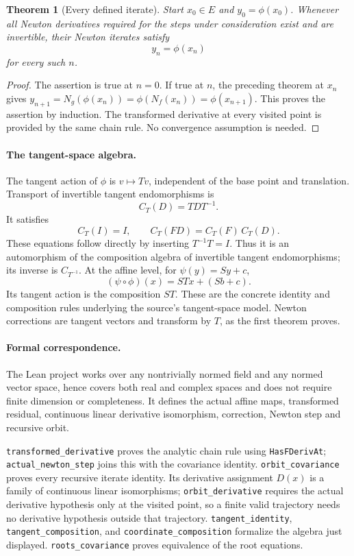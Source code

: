 \documentclass[11pt]{article}
\newtheorem{theorem}{Theorem}
\begin{document}
\newpage
\begin{theorem}[Every defined iterate]
Start $x_0\in E$ and $y_0=\phi(x_0)$. Whenever all Newton derivatives required for the steps under consideration exist and are invertible, their Newton iterates satisfy
\[
 y_n=\phi(x_n)
\]
for every such $n$.
\end{theorem}
\begin{proof}
The assertion is true at $n=0$. If true at $n$, the preceding theorem at $x_n$ gives
$y_{n+1}=N_g(\phi(x_n))=\phi(N_f(x_n))=\phi(x_{n+1})$.
This proves the assertion by induction. The transformed derivative at every visited point is provided by the same chain rule. No convergence assumption is needed.
\end{proof}

\paragraph{The tangent-space algebra.}
The tangent action of $\phi$ is $v\mapsto Tv$, independent of the base point and translation. Transport of invertible tangent endomorphisms is
\[
 C_T(D)=TDT^{-1}.
\]
It satisfies
\[
 C_T(I)=I,\qquad C_T(FD)=C_T(F)\,C_T(D).
\]
These equations follow directly by inserting $T^{-1}T=I$. Thus it is an automorphism of the composition algebra of invertible tangent endomorphisms; its inverse is $C_{T^{-1}}$. At the affine level, for $\psi(y)=Sy+c$,
\[
 (\psi\circ\phi)(x)=STx+(Sb+c).
\]
Its tangent action is the composition $ST$. These are the concrete identity and composition rules underlying the source's tangent-space model. Newton corrections are tangent vectors and transform by $T$, as the first theorem proves.

\paragraph{Formal correspondence.}
The Lean project works over any nontrivially normed field and any normed vector space, hence covers both real and complex spaces and does not require finite dimension or completeness. It defines the actual affine maps, transformed residual, continuous linear derivative isomorphism, correction, Newton step and recursive orbit.

\texttt{transformed\_\allowbreak derivative} proves the analytic chain rule using \texttt{HasFDerivAt}; \texttt{actual\_\allowbreak newton\_\allowbreak step} joins this with the covariance identity. \texttt{orbit\_\allowbreak covariance} proves every recursive iterate identity. Its derivative assignment $D(x)$ is a family of continuous linear isomorphisms; \texttt{orbit\_\allowbreak derivative} requires the actual derivative hypothesis only at the visited point, so a finite valid trajectory needs no derivative hypothesis outside that trajectory. \texttt{tangent\_\allowbreak identity}, \texttt{tangent\_\allowbreak composition}, and \texttt{coordinate\_\allowbreak composition} formalize the algebra just displayed. \texttt{roots\_\allowbreak covariance} proves equivalence of the root equations.
\end{document}
